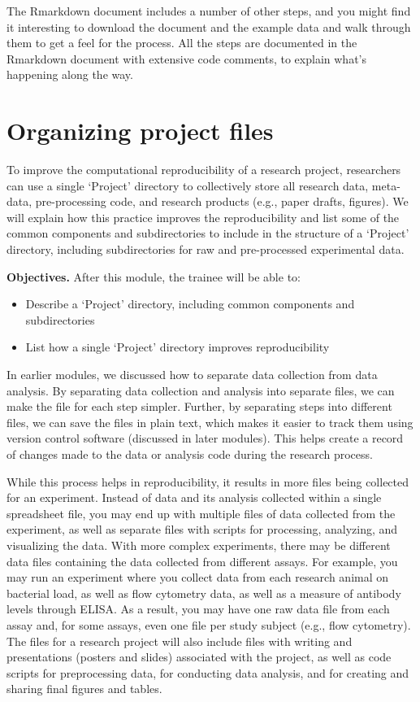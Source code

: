 \documentclass[]{tufte-book}
\providecommand{\tightlist}{%
  \setlength{\itemsep}{0pt}\setlength{\parskip}{0pt}}
\begin{document}
The Rmarkdown document includes a number of other steps, and you might find
it interesting to download the document and the example data and walk through
them to get a feel for the process. All the steps are documented in the
Rmarkdown document with extensive code comments, to explain what's happening
along the way.

\section{Organizing project files}\label{module6}

To improve the computational reproducibility of a research project, researchers
can use a single `Project' directory to collectively store all research data,
meta-data, pre-processing code, and research products (e.g., paper drafts,
figures). We will explain how this practice improves the reproducibility and
list some of the common components and subdirectories to include in the
structure of a `Project' directory, including subdirectories for raw and
pre-processed experimental data.

\textbf{Objectives.} After this module, the trainee will be able to:

\begin{itemize}
\tightlist
\item
  Describe a `Project' directory, including common components and subdirectories
\item
  List how a single `Project' directory improves reproducibility
\end{itemize}

In earlier modules, we discussed how to separate data collection from data
analysis. By separating data collection and analysis into separate files, we can
make the file for each step simpler. Further, by separating steps into different
files, we can save the files in plain text, which makes it easier to track them
using version control software (discussed in later modules). This helps create a
record of changes made to the data or analysis code during the research process.

While this process helps in reproducibility, it results in more files being
collected for an experiment. Instead of data and its analysis collected within a
single spreadsheet file, you may end up with multiple files of data collected
from the experiment, as well as separate files with scripts for processing,
analyzing, and visualizing the data. With more complex experiments, there may be
different data files containing the data collected from different assays. For example,
you may run an experiment where you collect data from each research animal on
bacterial load, as well as flow cytometry data, as well as a measure of antibody
levels through ELISA. As a result, you may have one raw data file from each
assay and, for some assays, even one file per study subject (e.g., flow
cytometry). The files for a research project will also include files with
writing and presentations (posters and slides) associated with the project, as
well as code scripts for preprocessing data, for conducting data analysis, and
for creating and sharing final figures and tables.
\end{document}
